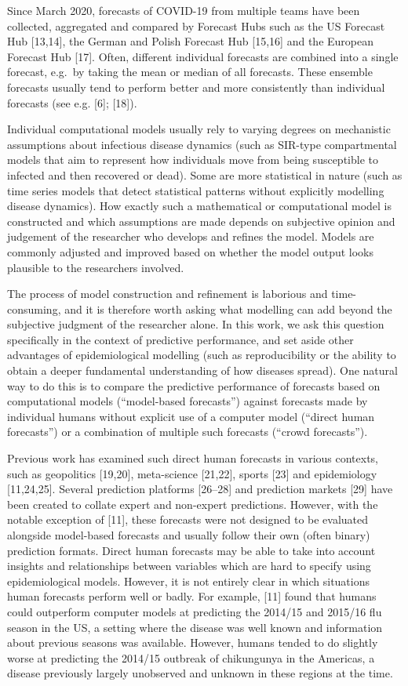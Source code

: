 \documentclass[10pt,letterpaper]{article}
\begin{document}
Since March 2020, forecasts of COVID-19 from multiple teams have been
collected, aggregated and compared by Forecast Hubs such as the US
Forecast Hub {[}13,14{]}, the German and Polish Forecast Hub {[}15,16{]}
and the European Forecast Hub {[}17{]}. Often, different individual
forecasts are combined into a single forecast, e.g.~by taking the mean
or median of all forecasts. These ensemble forecasts usually tend to
perform better and more consistently than individual forecasts (see e.g.
{[}6{]}; {[}18{]}).

Individual computational models usually rely to varying degrees on
mechanistic assumptions about infectious disease dynamics (such as
SIR-type compartmental models that aim to represent how individuals move
from being susceptible to infected and then recovered or dead). Some are
more statistical in nature (such as time series models that detect
statistical patterns without explicitly modelling disease dynamics). How
exactly such a mathematical or computational model is constructed and
which assumptions are made depends on subjective opinion and judgement
of the researcher who develops and refines the model. Models are
commonly adjusted and improved based on whether the model output looks
plausible to the researchers involved.

The process of model construction and refinement is laborious and
time-consuming, and it is therefore worth asking what modelling can add
beyond the subjective judgment of the researcher alone. In this work, we
ask this question specifically in the context of predictive performance,
and set aside other advantages of epidemiological modelling (such as
reproducibility or the ability to obtain a deeper fundamental
understanding of how diseases spread). One natural way to do this is to
compare the predictive performance of forecasts based on computational
models (``model-based forecasts'') against forecasts made by individual
humans without explicit use of a computer model (``direct human
forecasts'') or a combination of multiple such forecasts (``crowd
forecasts'').

Previous work has examined such direct human forecasts in various
contexts, such as geopolitics {[}19,20{]}, meta-science {[}21,22{]},
sports {[}23{]} and epidemiology {[}11,24,25{]}. Several prediction
platforms {[}26--28{]} and prediction markets {[}29{]} have been created
to collate expert and non-expert predictions. However, with the notable
exception of {[}11{]}, these forecasts were not designed to be evaluated
alongside model-based forecasts and usually follow their own (often
binary) prediction formats. Direct human forecasts may be able to take
into account insights and relationships between variables which are hard
to specify using epidemiological models. However, it is not entirely
clear in which situations human forecasts perform well or badly. For
example, {[}11{]} found that humans could outperform computer models at
predicting the 2014/15 and 2015/16 flu season in the US, a setting where
the disease was well known and information about previous seasons was
available. However, humans tended to do slightly worse at predicting the
2014/15 outbreak of chikungunya in the Americas, a disease previously
largely unobserved and unknown in these regions at the time.
\end{document}
